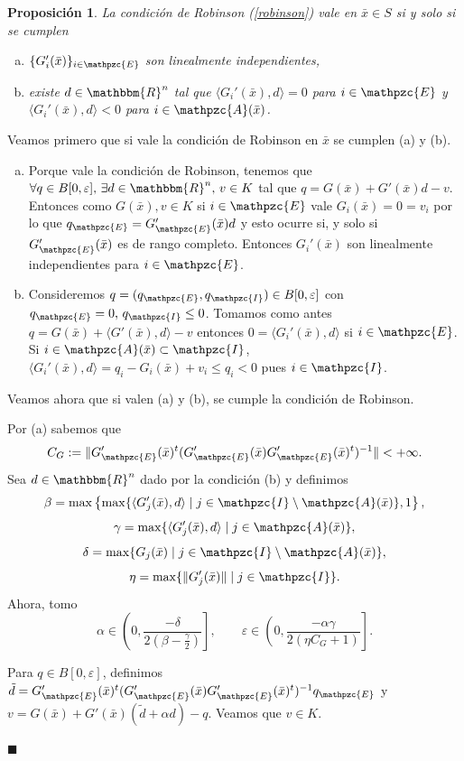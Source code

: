 \documentclass[a4paper,10pt]{book}
\newcommand{\R}{\mathbbm{R}}
\newcommand{\Rn}{\R^n}
\newcommand{\bx}{\bar{x}}
\newcommand{\cI}{\mathpzc{I}}
\newcommand{\cE}{\mathpzc{E}}
\newcommand{\cA}{\mathpzc{A}}
\newcommand{\la}{\langle}
\newcommand{\ra}{\rangle}
\newtheorem{prop}[teo]{Proposici\'on}
\newenvironment{dem}{\vspace*{-0.1cm}{\it Demostraci\'on:}}{\hfill
$\blacksquare$\\}
\begin{document}
\begin{prop}
La condición de Robinson (\ref{robinson}) vale en $\bx\in S$ si y solo si se cumplen
\begin{enumerate}[a)]
\item $\{G_i'(\bx)\}_{i\in\cE}$ son linealmente independientes,
\item existe $d\in\Rn$ tal que $\la G_i'(\bx),d\ra=0$ para $i\in\cE$ y $\la G_i'(\bx),d\ra<0$ para $i\in\cA(\bx)$.
\end{enumerate}
\end{prop}
\begin{dem}
Veamos primero que si vale la condición de Robinson en $\bx$ se cumplen (a) y (b).
\begin{enumerate}[a)]
\item Porque vale la condición de Robinson, tenemos que $\forall q\in B[0,\varepsilon],\,\exists d \in\Rn,\,v\in K$ tal que $q=G(\bx)+ G'(\bx)d-v$. Entonces como $G(\bx),v\in K$ si $i\in\cE$ vale $G_i(\bx)=0=v_i$ por lo que $q_\cE=G_\cE'(\bx)d$ y esto ocurre si, y solo si $G_\cE'(\bx)$ es de rango completo. Entonces $G_i'(\bx)$ son linealmente independientes para $i\in\cE$.
\item Consideremos $q=(q_\cE,q_\cI)\in B[0,\varepsilon]$ con $q_\cE=0,\,q_\cI\leq0$. Tomamos como antes $q=G(\bx)+\la G'(\bx),d\ra-v$ entonces $0=\la G_i'(\bx),d\ra$ si $i\in \cE$.
Si $i\in \cA(\bx)\subset \cI$, $\la G_i'(\bx),d\ra=q_i-G_i(\bx)+v_i\leq q_i<0$ pues $i\in \cI$.
\end{enumerate}

Veamos ahora que si valen (a) y (b), se cumple la condición de Robinson.

Por (a) sabemos que
$$C_G:=\|G_\cE'(\bx)^t(G_\cE'(\bx)G_\cE'(\bx)^t)^{-1}\|<+\infty.$$
Sea $d\in\Rn$ dado por la condición (b) y definimos
$$\beta=\mathrm{max}\left\{\mathrm{max}\{\la G_j'(\bx),d\ra\mid j\in \cI\setminus\cA(\bx)\},1\right\},$$
$$\gamma=\mathrm{max}\{\la G_j'(\bx),d\ra\mid j\in \cA(\bx)\},$$
$$\delta=\mathrm{max}\{G_j(\bx)\mid j\in \cI\setminus\cA(\bx)\},$$
$$\eta=\mathrm{max}\{\|G_j'(\bx)\|\mid j\in \cI\}.$$
Ahora, tomo
$$\alpha\in \left(0,\frac{-\delta}{2(\beta-\frac{\gamma}{2})}\right], \qquad \varepsilon\in\left(0,\frac{-\alpha\gamma}{2(\eta C_G+1)}\right].$$

Para $q\in B[0,\varepsilon]$, definimos $\tilde{d}=G_\cE'(\bx)^t(G_\cE'(\bx)G_\cE'(\bx)^t)^{-1}q_\cE$ y $v=G(\bx)+ G'(\bx)(\tilde{d}+\alpha d)-q$. Veamos que $v\in K$.


\end{dem}
\end{document}
